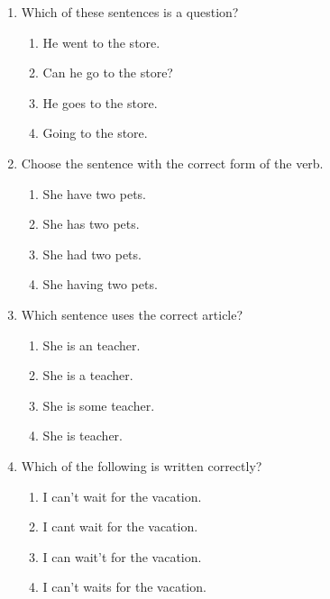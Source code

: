 \documentclass[12pt]{article}
\begin{document}
\begin{enumerate}
    \vspace{0.5cm}

    \item Which of these sentences is a question?

    \begin{enumerate}[label=\Alph*.]
        \item He went to the store.
        \item Can he go to the store?
        \item He goes to the store.
        \item Going to the store.
    \end{enumerate}

    \vspace{0.5cm}

    \item Choose the sentence with the correct form of the verb.

    \begin{enumerate}[label=\Alph*.]
        \item She have two pets.
        \item She has two pets.
        \item She had two pets.
        \item She having two pets.
    \end{enumerate}

    \vspace{0.5cm}

    \item Which sentence uses the correct article?

    \begin{enumerate}[label=\Alph*.]
        \item She is an teacher.
        \item She is a teacher.
        \item She is some teacher.
        \item She is teacher.
    \end{enumerate}

    \vspace{0.5cm}

    \item Which of the following is written correctly?

    \begin{enumerate}[label=\Alph*.]
        \item I can’t wait for the vacation.
        \item I cant wait for the vacation.
        \item I can wait’t for the vacation.
        \item I can’t waits for the vacation.
    \end{enumerate}


\end{enumerate}
\end{document}
